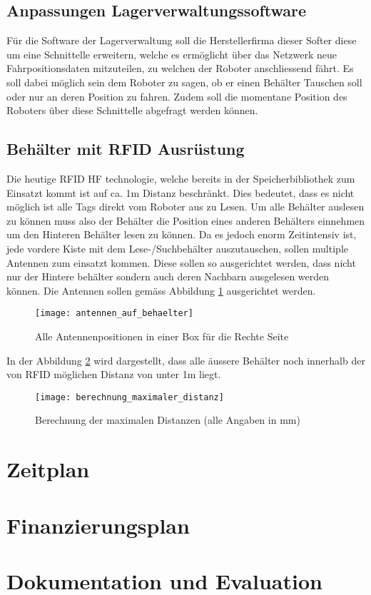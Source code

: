 \section{Anpassungen Lagerverwaltungssoftware}
\label{sec:roboterSWAnpassung}
Für die Software der Lagerverwaltung soll die Herstellerfirma dieser Softer diese um eine Schnittelle erweitern, welche es ermöglicht über das Netzwerk neue Fahrpositionsdaten mitzuteilen, zu welchen der Roboter anschliessend fährt. Es soll dabei möglich sein dem Roboter zu sagen, ob er einen Behälter Tauschen soll oder nur an deren Position zu fahren. Zudem soll die momentane Position des Roboters über diese Schnittelle abgefragt werden können. 

\section{Behälter mit RFID Ausrüstung}
\label{sec:behaelterMitRFID}
Die heutige RFID HF technologie, welche bereits in der Speicherbibliothek zum Einsatzt kommt ist auf ca. 1m Distanz beschränkt. Dies bedeutet, dass es nicht möglich ist alle Tags direkt vom Roboter aus zu Lesen. Um alle Behälter auslesen zu können muss also der Behälter die Position eines anderen Behälters einnehmen um den Hinteren Behälter lesen zu können. Da es jedoch enorm Zeitintensiv ist, jede vordere Kiste mit dem Lese-/Suchbehälter auszutauschen, sollen multiple Antennen zum einsatzt kommen. Diese sollen so ausgerichtet werden, dass nicht nur der Hintere behälter sondern auch deren Nachbarn ausgelesen werden können.
Die Antennen sollen gemäss Abbildung \ref{fig:antennenPositionen} ausgerichtet werden.

\begin{figure}
	\centering
	\texttt{[image: antennen\_auf\_behaelter]}
	\caption{Alle Antennenpositionen in einer Box für die Rechte Seite}
	\label{fig:antennenPositionen}
\end{figure}

In der Abbildung \ref{fig:distanzcalc} wird dargestellt, dass alle äussere Behälter noch innerhalb der von RFID möglichen Distanz von unter 1m liegt.

\begin{figure}
	\centering
	\texttt{[image: berechnung\_maximaler\_distanz]}
	\caption{Berechnung der maximalen Distanzen (alle Angaben in mm)}
	\label{fig:distanzcalc}
\end{figure}

\chapter{Zeitplan}

\chapter{Finanzierungsplan}

\chapter{Dokumentation und Evaluation}